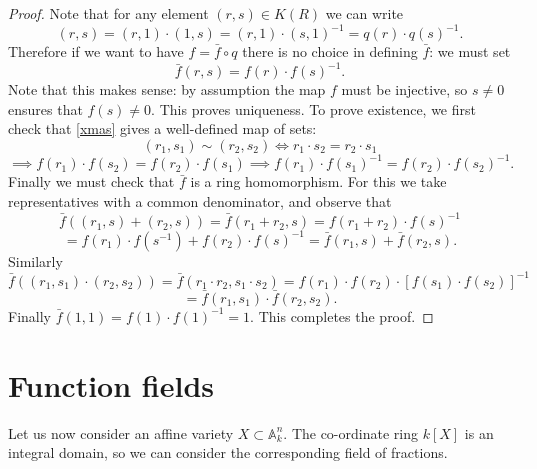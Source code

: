 \documentclass [12pt,oneside,a4paper,mathscr]{amsart}
\theoremstyle{definition}
\newcommand {\A}{\mathbb A}
\begin{document}
\begin{proof}
Note that for any element $(r,s)\in K(R)$ we can write
\[(r,s)= (r,1)\cdot (1,s)= (r,1)\cdot (s,1)^{-1}=q(r) \cdot q(s)^{-1}.\]
Therefore if we want to have  $f=\bar{f}\circ q$ there is no choice in defining $\bar{f}$: we must set \begin{equation}
\label{xmas}\bar{f}(r,s)=f(r) \cdot f(s)^{-1}.\end{equation}
Note that this makes sense: by assumption the map $f$ must be injective, so $s\neq 0$ ensures that $f(s)\neq 0$. This proves uniqueness. To prove existence, we first check that \eqref{xmas} gives a well-defined map of sets:
\[(r_1,s_1) \sim (r_2,s_2) \iff r_1 \cdot  s_2 = r_2 \cdot  s_1 \]\[\implies f(r_1)  \cdot f(s_2)=f(r_2) \cdot f(s_1) \implies f(r_1) \cdot  f(s_1)^{-1}=f(r_2) \cdot  f(s_2)^{-1}.\]
Finally we must check that $\bar{f}$ is a ring homomorphism. For this we take representatives with a common denominator, and observe that
\[\bar{f}((r_1,s)+(r_2,s))=\bar{f}(r_1+r_2,s)=f(r_1+r_2) \cdot f(s)^{-1}\]\[=f(r_1) \cdot f(s^{-1})+f(r_2) \cdot f(s)^{-1}=\bar{f}(r_1,s)+\bar{f}(r_2,s).\]
 Similarly
\[\bar{f}((r_1,s_1)\cdot(r_2,s_2))=\bar{f}(r_1 \cdot r_2,s_1 \cdot s_2)=f(r_1) \cdot f(r_2) \cdot [f(s_1) \cdot f(s_2)]^{-1}\]\[=\bar{f}(r_1,s_1) \cdot \bar{f}(r_2,s_2).\]
Finally $\bar{f}(1,1)=f(1) \cdot f(1)^{-1}=1$. This completes the proof.
\end{proof}






\section{Function fields}

Let us now consider an affine variety $X\subset \A^n_k$. The co-ordinate ring $k[X]$ is an integral domain, so we can consider the corresponding field of fractions.
\end{document}
